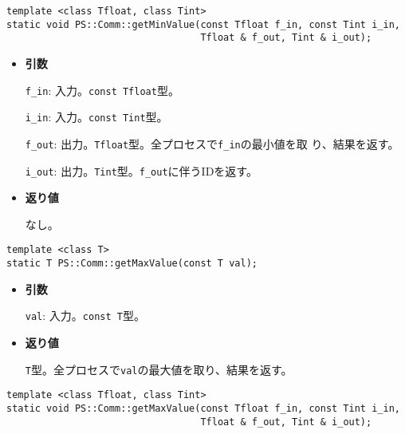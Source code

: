 \begin{screen}
\begin{verbatim}
template <class Tfloat, class Tint>
static void PS::Comm::getMinValue(const Tfloat f_in, const Tint i_in,
                                  Tfloat & f_out, Tint & i_out);
\end{verbatim}
\end{screen}

\begin{itemize}

\item{{\bf 引数}}

{\tt f\_in}: 入力。{\tt const Tfloat}型。

{\tt i\_in}: 入力。{\tt const Tint}型。

{\tt f\_out}: 出力。{\tt Tfloat}型。全プロセスで{\tt f\_in}の最小値を取
り、結果を返す。

{\tt i\_out}: 出力。{\tt Tint}型。{\tt f\_out}に伴うIDを返す。

\item{{\bf 返り値}}

なし。

\end{itemize}


\begin{screen}
\begin{verbatim}
template <class T>
static T PS::Comm::getMaxValue(const T val);
\end{verbatim}
\end{screen}

\begin{itemize}

\item{{\bf 引数}}

{\tt val}: 入力。{\tt const T}型。

\item{{\bf 返り値}}

{\tt T}型。全プロセスで{\tt val}の最大値を取り、結果を返す。

\end{itemize}

\begin{screen}
\begin{verbatim}
template <class Tfloat, class Tint>
static void PS::Comm::getMaxValue(const Tfloat f_in, const Tint i_in,
                                  Tfloat & f_out, Tint & i_out);
\end{verbatim}
\end{screen}

